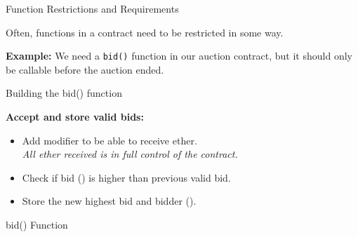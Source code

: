 \documentclass[]{beamer}
\begin{document}
\begin{frame}{Function Restrictions and Requirements}

Often, functions in a contract need to be restricted in some way.

\vspace{0.5em}

\textbf{Example:} We need a \texttt{bid()} function in our auction contract, but it should only be callable before the auction ended.

	
\end{frame}

%
\begin{frame}{Building the bid() function}

\textbf{Accept and store valid bids:}
\begin{itemize}
	\item Add  modifier to be able to receive ether.\\
	\textit{All ether received is in full control of the contract.}
	\item Check if bid () is higher than previous valid bid.
	\item Store the new highest bid and bidder ().
\end{itemize}

\begin{samplecode}{bid() Function}
	
\end{samplecode}


\end{frame}
\end{document}
